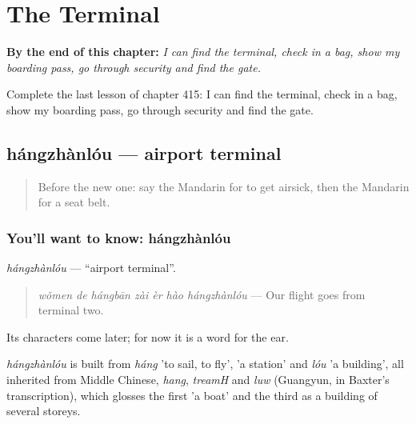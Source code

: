 
\chapter{The Terminal}
\label{ch:zh-the-terminal}

\begin{chapteropening}
\textbf{By the end of this chapter:} \emph{I can find the terminal, check in a bag, show my boarding pass, go through security and find the gate.}

Complete the last lesson of chapter 415: I can find the terminal, check in a bag, show my boarding pass, go through security and find the gate.
\end{chapteropening}

\section[hángzhànlóu]{hángzhànlóu — airport terminal}

\label{lesson:ZH-C415-hangzhanlou}



\begin{quote}
Before the new one: say the Mandarin for to get airsick, then the Mandarin for a seat belt.
\end{quote}

\subsection*{You'll want to know: hángzhànlóu}
\emph{hángzhànlóu} — \textquotedblleft{}airport terminal\textquotedblright{}.

\begin{quote}
\emph{wǒmen de hángbān zài èr hào hángzhànlóu} — Our flight goes from terminal two.
\end{quote}

Its characters come later; for now it is a word for the ear.

\begin{cousinweb}
\emph{hángzhànlóu} is built from \emph{háng} 'to sail, to fly',  'a station' and \emph{lóu} 'a building', all inherited from Middle Chinese, \emph{hang}, \emph{treamH} and \emph{luw} (Guangyun, in Baxter's transcription), which glosses the first 'a boat' and the third as a building of several storeys.
\end{cousinweb}

